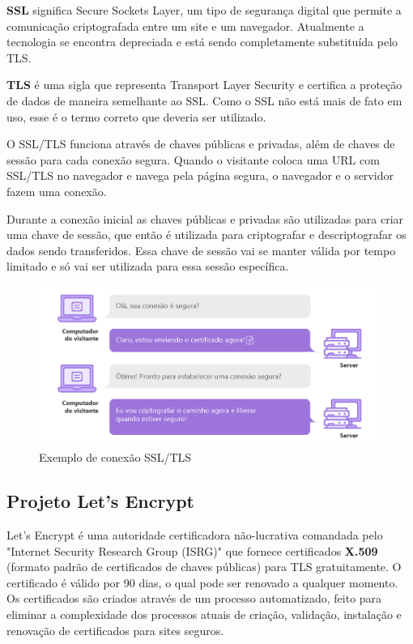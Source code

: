 \documentclass{article}
\begin{document}
\textbf{SSL} significa Secure Sockets Layer, um tipo de segurança digital que permite a comunicação criptografada entre um site e um navegador. Atualmente a tecnologia se encontra depreciada e está sendo completamente substituída pelo TLS.

\textbf{TLS} é uma sigla que representa Transport Layer Security e certifica a proteção de dados de maneira semelhante ao SSL. Como o SSL não está mais de fato em uso, esse é o termo correto que deveria ser utilizado.

O SSL/TLS funciona através de chaves públicas e privadas, além de chaves de sessão para cada conexão segura. Quando o visitante coloca uma URL com SSL/TLS no navegador e navega pela página segura, o navegador e o servidor fazem uma conexão.

Durante a conexão inicial as chaves públicas e privadas são utilizadas para criar uma chave de sessão, que então é utilizada para criptografar e descriptografar os dados sendo transferidos. Essa chave de sessão vai se manter válida por tempo limitado e só vai ser utilizada para essa sessão específica.

\begin{figure}[h]
\centering
\includegraphics[width=13.5cm]{imagem1.png}
\caption{Exemplo de conexão SSL/TLS}
\end{figure}
\subsection{Projeto Let’s Encrypt}
Let's Encrypt é uma autoridade certificadora não-lucrativa comandada pelo "Internet Security Research Group (ISRG)" que fornece certificados \textbf{X.509} (formato padrão de certificados de chaves públicas) para TLS gratuitamente. O certificado é válido por 90 dias, o qual pode ser renovado a qualquer momento. Os certificados são criados através de um processo automatizado, feito  para eliminar a complexidade dos processos atuais de criação, validação, instalação e renovação de certificados para sites seguros.
\end{document}
